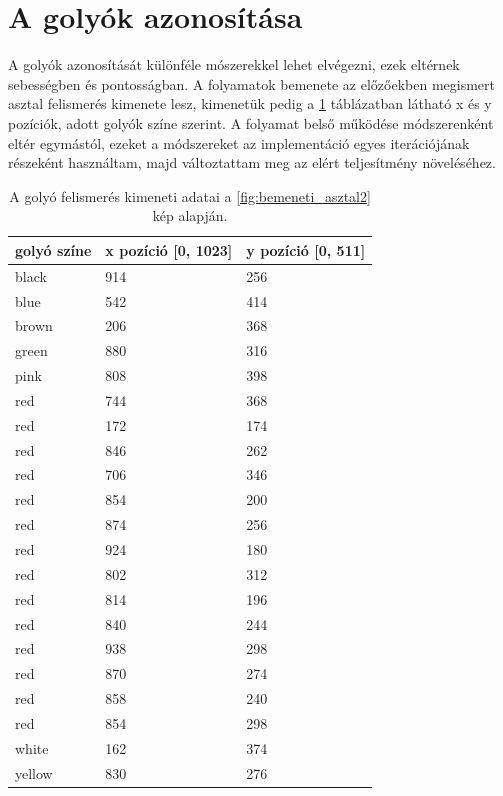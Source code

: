 \section{A golyók azonosítása}
A golyók azonosítását különféle mószerekkel lehet elvégezni, ezek eltérnek sebességben és pontosságban. A folyamatok bemenete az előzőekben megismert asztal felismerés kimenete lesz, kimenetük pedig a \ref{tab:felismert_koordinatak} táblázatban látható x és y pozíciók, adott golyók színe szerint. A folyamat belső működése módszerenként eltér egymástól, ezeket a módszereket az implementáció egyes iterációjának részeként használtam, majd változtattam meg az elért teljesítmény növeléséhez.

\begin{table}[!ht]
    \caption{A golyó felismerés kimeneti adatai a \ref{fig:bemeneti_asztal2} kép alapján.}
    \label{tab:felismert_koordinatak}
	\footnotesize
	\centering
	\begin{tabular}{ l l l }
		\toprule
		golyó színe & x pozíció [0, 1023] & y pozíció [0, 511] \\
		\midrule
        black  & 914 & 256\\  
        blue   & 542 & 414\\  
        brown  & 206 & 368\\  
        green  & 880 & 316\\  
        pink   & 808 & 398\\  
        red    & 744 & 368\\  
        red    & 172 & 174\\  
        red    & 846 & 262\\  
        red    & 706 & 346\\  
        red    & 854 & 200\\  
        red    & 874 & 256\\  
        red    & 924 & 180\\  
        red    & 802 & 312\\  
        red    & 814 & 196\\  
        red    & 840 & 244\\  
        red    & 938 & 298\\  
        red    & 870 & 274\\  
        red    & 858 & 240\\  
        red    & 854 & 298\\  
        white  & 162 & 374\\  
        yellow & 830 & 276\\  
		\bottomrule
	\end{tabular}
\end{table}

